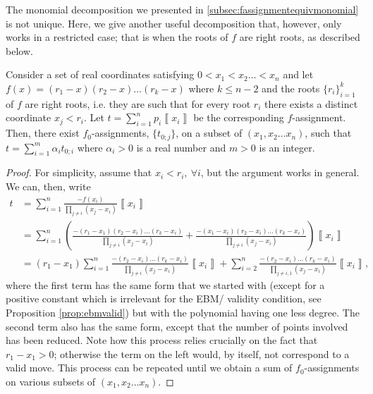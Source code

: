 \documentclass{theoretics}
\begin{document}
The monomial decomposition we presented in \cref{subsec:fassignmentequivmonomial} is not unique. Here, we give another useful
decomposition that, however, only works in a restricted case; that is when the roots of $f$ are right roots, as described below.
\begin{lemma}
	Consider a set of real coordinates satisfying $0<x_{1}<x_{2}\dots<x_{n}$
	and let $f(x)=(r_{1}-x)(r_{2}-x)\dots(r_{k}-x)$ where $k\le n-2$
	and the roots $\{r_{i}\}_{i=1}^{k}$ of $f$ are right roots, i.e.
	they are such that for every root $r_{i}$ there exists a distinct
	coordinate $x_{j}<r_{i}$. Let $t=\sum_{i=1}^{n}p_{i}\left\llbracket x_{i}\right\rrbracket $
	be the corresponding $f$-assignment. Then, there exist $f_{0}$-assignments, $\{t_{0;j}\}$,
	on a subset of $(x_{1},x_{2}\dots x_{n})$, such that $t=\sum_{i=1}^{m}\alpha_{i}t_{0;i}$
	where $\alpha_{i}>0$ is a real number and $m>0$ is an integer. \label{lem:rightRoots}
\end{lemma}

\begin{proof}
	For simplicity, assume that $x_{i}<r_{i}, \ \forall i$, but the
	argument works in general. We can, then, write
	\begin{align*}
	t & =\sum_{i=1}^{n}\frac{-f(x_{i})}{\prod_{j\neq i}(x_{j}-x_{i})}\left\llbracket x_{i}\right\rrbracket \\
	& =\sum_{i=1}^{n}\left(\frac{-(r_{1}-x_{1})(r_{2}-x_{i})\dots(r_{k}-x_{i})}{\prod_{j\neq i}(x_{j}-x_{i})}+\frac{-(x_{1}-x_{i})(r_{2}-x_{i})\dots(r_{k}-x_{i})}{\prod_{j\neq i}(x_{j}-x_{i})}\right)\left\llbracket x_{i}\right\rrbracket \\
	& =(r_{1}-x_{1})\sum_{i=1}^{n}\frac{-(r_{2}-x_{i})\dots(r_{k}-x_{i})}{\prod_{j\neq i}(x_{j}-x_{i})}\left\llbracket x_{i}\right\rrbracket +\sum_{i=2}^{n}\frac{-(r_{2}-x_{i})\dots(r_{k}-x_{i})}{\prod_{j\neq i,1}(x_{j}-x_{i})}\left\llbracket x_{i}\right\rrbracket ,
	\end{align*}
	where the first term has the same form that we started with (except
	for a positive constant which is irrelevant for the EBM/ validity condition, see Proposition \ref{prop:ebmvalid}) but with the polynomial having one less
	degree. The second term also has the same form, except that the number
	of points involved has been reduced. Note how this process relies
	crucially on the fact that $r_{1}-x_{1}>0$; otherwise the term
	on the left would, by itself, not correspond to a valid move. This
	process can be repeated until we obtain a sum of $f_{0}$-assignments
	on various subsets of $(x_{1},x_{2}\dots x_{n})$.
\end{proof}
\end{document}
